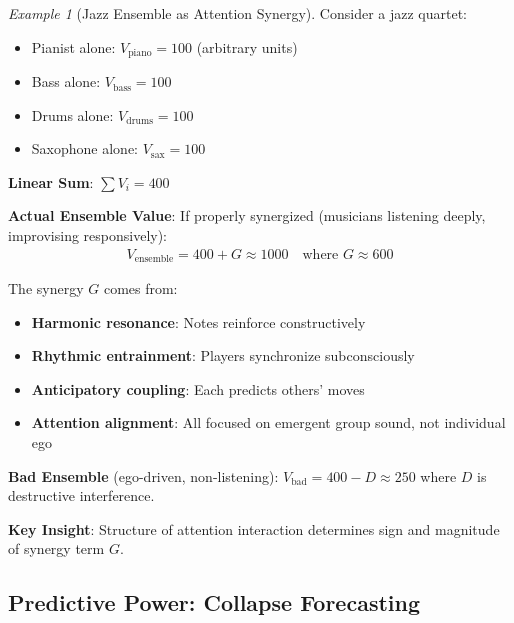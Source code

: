 \documentclass[11pt,a4paper]{article}
\theoremstyle{definition}
\theoremstyle{remark}
\newtheorem{example}{Example}[section]
\begin{document}
\begin{example}[Jazz Ensemble as Attention Synergy]
Consider a jazz quartet:
\begin{itemize}
    \item Pianist alone: \(V_{\text{piano}} = 100\) (arbitrary units)
    \item Bass alone: \(V_{\text{bass}} = 100\)
    \item Drums alone: \(V_{\text{drums}} = 100\)
    \item Saxophone alone: \(V_{\text{sax}} = 100\)
\end{itemize}

\textbf{Linear Sum}: \(\sum V_i = 400\)

\textbf{Actual Ensemble Value}: If properly synergized (musicians listening deeply, improvising responsively):
\begin{align}
V_{\text{ensemble}} = 400 + G \approx 1000 \quad \text{where } G \approx 600
\end{align}

The synergy \(G\) comes from:
\begin{itemize}
    \item \textbf{Harmonic resonance}: Notes reinforce constructively
    \item \textbf{Rhythmic entrainment}: Players synchronize subconsciously
    \item \textbf{Anticipatory coupling}: Each predicts others' moves
    \item \textbf{Attention alignment}: All focused on emergent group sound, not individual ego
\end{itemize}

\textbf{Bad Ensemble} (ego-driven, non-listening): \(V_{\text{bad}} = 400 - D \approx 250\) where \(D\) is destructive interference.

\textbf{Key Insight}: Structure of attention interaction determines sign and magnitude of synergy term \(G\).
\end{example}

\subsection{Predictive Power: Collapse Forecasting}
\end{document}
